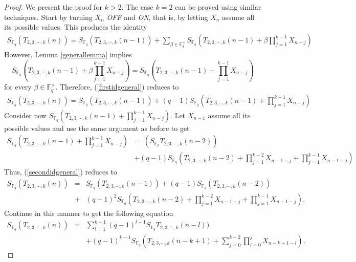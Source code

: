 \begin{proof}
We present the proof for $k>2$.  The case $k=2$ can be proved using similar techniques.
 Start by turning $X_n$ {\it OFF} and {\it ON}, that is, by letting $X_n$ assume all its possible values.  This produces the identity
 \begin{eqnarray}
 \label{firstidgeneral}
  S_{\mathbb{F}_q}(T_{2,3,\cdots,k}(n))=S_{\mathbb{F}_q}(T_{2,3,\cdots,k}(n-1))+ \sum_{\beta \in \mathbb{F}_q^{\times}}S_{\mathbb{F}_q}\left(T_{2,3,\cdots,k}(n-1)+\beta \prod_{j=1}^{k-1} X_{n-j}\right)
 \end{eqnarray}
However, Lemma \ref{generallemma} implies
\begin{equation}
 S_{\mathbb{F}_q}\left(T_{2,3,\cdots,k}(n-1)+\beta \prod_{j=1}^{k-1} X_{n-j}\right)=S_{\mathbb{F}_q}\left(T_{2,3,\cdots,k}(n-1)+ \prod_{j=1}^{k-1} X_{n-j}\right)
\end{equation}
for every $\beta \in \mathbb{F}_q^{\times}$.  Therefore, (\ref{firstidgeneral}) reduces to 
 \begin{eqnarray}
 \label{secondidgeneral}
  S_{\mathbb{F}_q}(T_{2,3,\cdots,k}(n))=S_{\mathbb{F}_q}(T_{2,3,\cdots,k}(n-1))+ (q-1)S_{\mathbb{F}_q}\left(T_{2,3,\cdots,k}(n-1)+ \prod_{j=1}^{k-1} X_{n-j}\right)
 \end{eqnarray}
Consider now $S_{\mathbb{F}_q}\left(T_{2,3,\cdots,k}(n-1)+ \prod_{j=1}^{k-1} X_{n-j}\right)$. Let $X_{n-1}$ assume all its possible values and use the same argument as before to get
\begin{align}\nonumber
  S_{\mathbb{F}_q}(T_{2,3,\cdots,k}(n-1)+ \prod_{j=1}^{k-1} X_{n-j})&= \left(S_{\mathbb{F}_p} T_{2,3,\cdots,k}(n-2)\right)\\
 &+ (q-1) S_{\mathbb{F}_q}\left(T_{2,3,\cdots,k}(n-2)+\prod_{j=1}^{k-2} X_{n-1-j}+\prod_{j=1}^{k-1} X_{n-1-j}\right)
\end{align}
Thus, (\ref{secondidgeneral}) reduces to
\begin{eqnarray}\nonumber
 S_{\mathbb{F}_q}(T_{2,3,\cdots,k}(n))&=&S_{\mathbb{F}_q}(T_{2,3,\cdots,k}(n-1))+(q-1)S_{\mathbb{F}_q}\left(T_{2,3,\cdots,k}(n-2)\right)\\
 &+& (q-1)^2 S_{\mathbb{F}_q}\left(T_{2,3,\cdots,k}(n-2)+\prod_{j=1}^{k-2} X_{n-1-j}+\prod_{j=1}^{k-1} X_{n-1-j}\right).
\end{eqnarray}
Continue in this manner to get the following equation
\begin{eqnarray}
 \label{finalidgeneral}
 S_{\mathbb{F}_q}(T_{2,3,\cdots,k}(n))&=& \sum_{l=1}^{k-1}(q-1)^{l-1}S_{\mathbb{F}_q}T_{2,3,\cdots,k}(n-l))\\\nonumber
 &&+(q-1)^{k-1} S_{\mathbb{F}_q}\left(T_{2,3,\cdots,k}(n-k+1)+\sum_{j=0}^{k-2}\prod_{l=0}^j X_{n-k+1-l}\right).
\end{eqnarray}


\end{proof}
